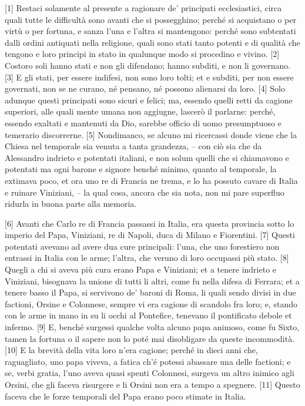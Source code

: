{[}1{]} Restaci solamente al presente a ragionare de' principati
ecclesiastici, circa quali tutte le difficultà sono avanti che si
possegghino; perché si acquistano o per virtù o per fortuna, e sanza
l'una e l'altra si mantengono: perché sono subtentati dalli ordini
antiquati nella religione, quali sono stati tanto potenti e di qualità
che tengono e loro principi in stato in qualunque modo si procedino e
vivino. {[}2{]} Costoro soli hanno stati e non gli difendano; hanno
subditi, e non li governano. {[}3{]} E gli stati, per essere indifesi,
non sono loro tolti; et e subditi, per non essere governati, non se ne
curano, né pensano, né possono alienarsi da loro. {[}4{]} Solo adunque
questi principati sono sicuri e felici; ma, essendo quelli retti da
cagione superiori, alle quali mente umana non aggiugne, lascerò il
parlarne: perché, essendo exaltati e mantenuti da Dio, sarebbe officio
di uomo presumptuoso e temerario discorrerne. {[}5{]} Nondimanco, se
alcuno mi ricercassi donde viene che la Chiesa nel temporale sia venuta
a tanta grandezza, -- con ciò sia che da Alessandro indrieto e potentati
italiani, e non solum quelli che si chiamavono e potentati ma ogni
barone e signore benché minimo, quanto al temporale, la extimava poco,
et ora uno re di Francia ne trema, e lo ha possuto cavare di Italia e
ruinare Viniziani, -- la qual cosa, ancora che sia nota, non mi pare
superfluo ridurla in buona parte alla memoria.

\quebra

{[}6{]} Avanti che Carlo re di Francia passassi in Italia, era questa
provincia sotto lo imperio del Papa, Viniziani, re di Napoli, duca di
Milano e Fiorentini. {[}7{]} Questi potentati avevano ad avere dua cure
principali: l'una, che uno forestiero non entrassi in Italia con le
arme; l'altra, che veruno di loro occupassi più stato. {[}8{]} Quegli a
chi si aveva più cura erano Papa e Viniziani; et a tenere indrieto e
Viniziani, bisognava la unione di tutti li altri, come fu nella difesa
di Ferrara; et a tenere basso il Papa, si servivono de' baroni di Roma,
li quali sendo divisi in due factioni, Orsine e Colonnese, sempre vi era
cagione di scandolo fra loro; e, stando con le arme in mano in su li
occhi al Pontefice, tenevano il pontificato debole et infermo. {[}9{]}
E, benché surgessi qualche volta alcuno papa animoso, come fu Sixto,
tamen la fortuna o il sapere non lo poté mai disobligare da queste
incommodità. {[}10{]} E la brevità della vita loro n'era cagione; perché
in dieci anni che, raguagliato, uno papa viveva, a fatica ch'é potessi
abassare una delle factioni; e se, verbi gratia, l'uno aveva quasi
spenti Colonnesi, surgeva un altro inimico agli Orsini, che gli faceva
risurgere e li Orsini non era a tempo a spegnere. {[}11{]} Questo faceva
che le forze temporali del Papa erano poco stimate in Italia.

